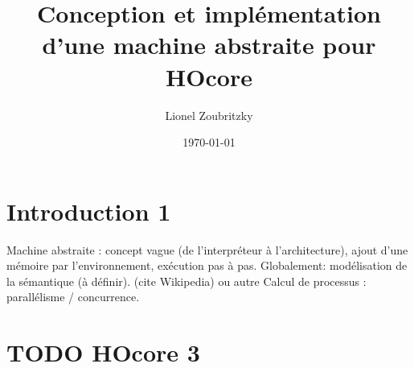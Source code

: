 \documentclass[11pt]{article}
\author{Lionel Zoubritzky}
\date{\today}
\title{Conception et implémentation d'une machine abstraite pour HOcore}
\begin{document}
\maketitle
\tableofcontents

\newcommand{\send}[2]{\bar{#1}\left\langle #2\right\rangle}
\newcommand{\get}[2]{#1.\left( #2\right)}
\newcommand{\prog}[1]{\left\{ \begin{array}{l}#1\end{array} \right\}}
\newcommand{\block}[1]{\left[#1\right]}
\renewcommand{\empty}{\left[\,\right]}
\newcommand{\paren}[1]{\left(#1\right)}
\newcommand{\abs}[1]{\left|#1\right|}
\newcommand{\len}{\text{len}}
\newcommand{\env}{\text{env}}
\newcommand{\size}{\text{size}}
\newcommand{\level}{\text{Level}}
\newcommand{\machine}[1]{\left\llbracket{#1}\right\rrbracket_{\mathcal{M}}}
\newcommand{\new}[1]{\left\llbracket{#1}\right\rrbracket_{\mathcal{A}}}
\newcommand{\process}[1]{\left\llbracket{#1}\right\rrbracket_{\mathcal{P}}}
\newcommand{\sizeof}[1]{\text{size}\left(#1\right)}
\newcommand{\definition}{\refstepcounter{c_def}
\textbf{Definition \arabic{c_def}.} }
\newcommand{\theorem}{\refstepcounter{c_theo}
\textbf{Theorem \arabic{c_theo}.} }
\newcommand{\lemma}{\refstepcounter{c_theo}
\textbf{Lemma \arabic{c_theo}.} }
\newcommand{\corollary}{\refstepcounter{c_theo}
\textbf{Corollary \arabic{c_theo}.} }
\newcommand{\proof}{\textbf{\\Proof of \arabic{c_theo}.} }
\newcommand{\transmit}[1]{\overset{#1}\longrightarrow}
\newcommand{\transmitb}[1]{\overset{\left(\overline{#1}\right)}\longrightarrow}
\newcommand{\transmitn}[1]{\overset{\overline{#1}+}\longrightarrow}
\newcommand{\transit}[1]{\overset{#1}\rightarrow}
\newcommand{\io}{\sim_{\texttt{IO}}^\circ}
\newcommand{\bisim}{\approx_m}
\newcommand{\stateA}[1]{\left(#1\right)_{\mathcal{A}}}

\section{Introduction 1}
\label{sec-1}
Machine abstraite : concept vague (de l'interpréteur à l'architecture),
ajout d'une mémoire par l'environnement, exécution pas à pas. Globalement:
modélisation de la sémantique (à définir). (cite Wikipedia) ou autre
Calcul de processus : parallélisme / concurrence.


\section{{\bfseries\sffamily TODO} HOcore 3}
\label{sec-2}
\end{document}
